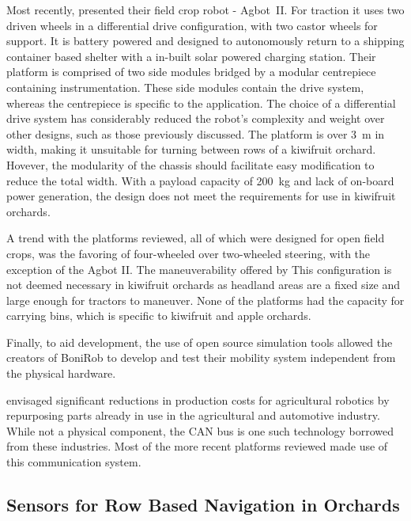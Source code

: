 \documentclass[preprint,authoryear,12pt]{elsarticle}
\begin{document}
        Most recently, \cite{Bawden2017} presented their field crop robot - Agbot~II.
        For traction it uses two driven wheels in a differential drive configuration, with two castor wheels for support.
        It is battery powered and designed to autonomously return to a shipping container based shelter with a in-built solar powered charging station.
        Their platform is comprised of two side modules bridged by a modular centrepiece containing instrumentation.
        These side modules contain the drive system, whereas the centrepiece is specific to the application.
        The choice of a differential drive system has considerably reduced the robot's complexity and weight over other designs, such as those previously discussed.
        The platform is over \SI{3}{\meter} in width, making it unsuitable for turning between rows of a kiwifruit orchard.
        Hovever, the modularity of the chassis should facilitate easy modification to reduce the total width.
        With a payload capacity of \SI{200}{\kilo\gram} and lack of on-board power generation, the design does not meet the requirements for use in kiwifruit orchards.

        A trend with the platforms reviewed, all of which were designed for open field crops, was the favoring of four-wheeled over two-wheeled steering, with the exception of the Agbot II.
        The maneuverability offered by
        This configuration is not deemed necessary in kiwifruit orchards as headland areas are a fixed size and large enough for tractors to maneuver.
        None of the platforms had the capacity for carrying bins, which is specific to kiwifruit and apple orchards.

        Finally, to aid development, the use of open source simulation tools allowed the creators of BoniRob to develop and test their mobility system independent from the physical hardware.

        \cite{Blackmore2007} envisaged significant reductions in production costs for agricultural robotics by repurposing parts already in use in the agricultural and automotive industry.
        While not a physical component, the CAN bus is one such technology borrowed from these industries.
        Most of the more recent platforms reviewed made use of this communication system.

    \subsection{Sensors for Row Based Navigation in Orchards}
\end{document}
